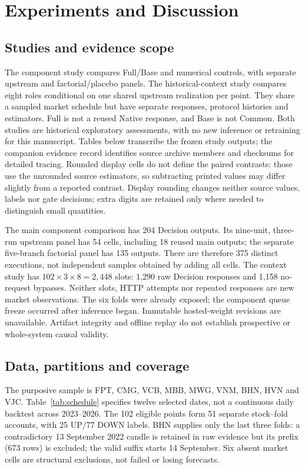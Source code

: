 \chapter{Experiments and Discussion}\label{s:016253c474e8e6bb}
\section{Studies and evidence scope}\label{s:26fcfd1c2d723181}
The component study compares Full/Base and numerical controls, with
separate upstream and factorial/placebo panels. The historical-context
study compares eight roles conditional on one shared upstream realization
per point. They share a sampled market schedule but have separate
responses, protocol histories and estimators. Full is not a reused Native
response, and Base is not Common. Both studies are historical exploratory
assessments, with no new inference or retraining for this manuscript.
Tables below transcribe the frozen study outputs; the companion evidence
record identifies source archive members and checksums for detailed tracing.
Rounded display cells do not define the paired contrasts: those use
the unrounded source estimators, so subtracting printed values may differ
slightly from a reported contrast. Display rounding changes neither source
values, labels nor gate decisions; extra digits are retained only where
needed to distinguish small quantities.

The main component comparison has 204 Decision outputs. Its nine-unit, three-run
upstream panel has 54 cells, including 18 reused main outputs; the separate
five-branch factorial panel has 135 outputs. There are therefore 375
distinct executions, not independent samples obtained by adding all cells.
The context study has $102\times3\times8=2,448$ slots: 1,290 raw Decision responses
and 1,158 no-request bypasses. Neither slots, HTTP attempts nor repeated
responses are new market observations. The six folds were already exposed;
the component queue freeze occurred after inference began. Immutable
hosted-weight revisions are unavailable. Artifact integrity and offline
replay do not establish prospective or whole-system causal validity.

\section{Data, partitions and coverage}\label{s:8be41ee200674674}
The purposive sample is FPT, CMG, VCB, MBB, MWG, VNM, BHN, HVN and VJC.
Table~\ref{tab:schedule} specifies twelve selected dates, not a continuous
daily backtest across 2023--2026. The 102 eligible points form 51 separate
stock--fold accounts, with 25 UP/77 DOWN labels. BHN supplies only the
last three folds: a contradictory 13 September 2022 candle is retained
in raw evidence but its prefix (673 rows) is excluded; the valid suffix
starts 14 September. Six absent market cells are structural exclusions,
not failed or losing forecasts.

